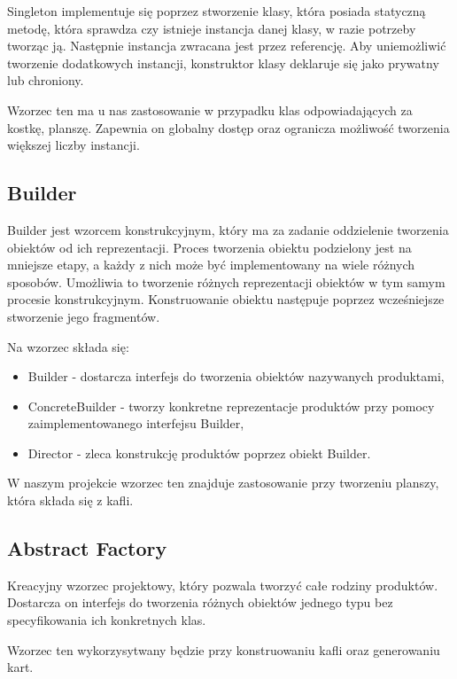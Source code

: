 \documentclass[a4paper, 11pt]{article}
\begin{document}
Singleton implementuje się poprzez stworzenie klasy, która posiada statyczną metodę, która sprawdza czy istnieje instancja danej klasy, w razie potrzeby tworząc ją. Następnie instancja zwracana jest przez referencję. Aby uniemożliwić tworzenie dodatkowych instancji, konstruktor klasy deklaruje się jako prywatny lub chroniony.

Wzorzec ten ma u nas zastosowanie w przypadku klas odpowiadających za kostkę, planszę. Zapewnia on globalny dostęp oraz ogranicza możliwość tworzenia większej liczby instancji. 

	\subsection{Builder}
	\indent
	
Builder jest wzorcem konstrukcyjnym, który ma za zadanie oddzielenie tworzenia obiektów od ich reprezentacji. 
Proces tworzenia obiektu podzielony jest na mniejsze etapy, a każdy z nich może być implementowany na wiele różnych sposobów. Umożliwia to tworzenie różnych reprezentacji obiektów w tym samym procesie konstrukcyjnym.
Konstruowanie obiektu następuje poprzez wcześniejsze stworzenie jego fragmentów.


Na wzorzec składa się:
\begin{itemize}

\item Builder - dostarcza interfejs do tworzenia obiektów nazywanych produktami,
\item ConcreteBuilder - tworzy konkretne reprezentacje produktów przy pomocy zaimplementowanego interfejsu Builder,
\item Director - zleca konstrukcję produktów poprzez obiekt Builder.
\end{itemize}

W naszym projekcie wzorzec ten znajduje zastosowanie przy tworzeniu planszy, która składa się z kafli.


	\subsection{Abstract Factory}
\indent

Kreacyjny wzorzec projektowy, który pozwala tworzyć całe rodziny produktów. Dostarcza on interfejs do tworzenia różnych obiektów jednego typu bez specyfikowania ich konkretnych klas.

Wzorzec ten wykorzysytwany będzie przy konstruowaniu kafli oraz generowaniu kart.
\end{document}

